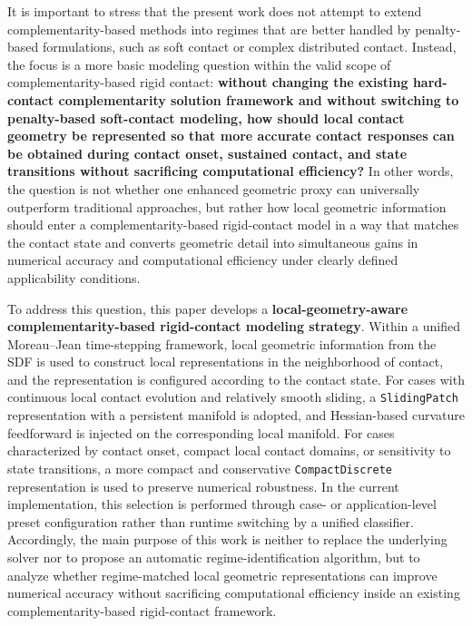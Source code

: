 It is important to stress that the present work does not attempt to extend complementarity-based methods into regimes that are better handled by penalty-based formulations, such as soft contact or complex distributed contact. Instead, the focus is a more basic modeling question within the valid scope of complementarity-based rigid contact: \textbf{without changing the existing hard-contact complementarity solution framework and without switching to penalty-based soft-contact modeling, how should local contact geometry be represented so that more accurate contact responses can be obtained during contact onset, sustained contact, and state transitions without sacrificing computational efficiency?} In other words, the question is not whether one enhanced geometric proxy can universally outperform traditional approaches, but rather how local geometric information should enter a complementarity-based rigid-contact model in a way that matches the contact state and converts geometric detail into simultaneous gains in numerical accuracy and computational efficiency under clearly defined applicability conditions.

To address this question, this paper develops a \textbf{local-geometry-aware complementarity-based rigid-contact modeling strategy}. Within a unified Moreau--Jean time-stepping framework, local geometric information from the SDF is used to construct local representations in the neighborhood of contact, and the representation is configured according to the contact state. For cases with continuous local contact evolution and relatively smooth sliding, a \texttt{SlidingPatch} representation with a persistent manifold is adopted, and Hessian-based curvature feedforward is injected on the corresponding local manifold. For cases characterized by contact onset, compact local contact domains, or sensitivity to state transitions, a more compact and conservative \texttt{CompactDiscrete} representation is used to preserve numerical robustness. In the current implementation, this selection is performed through case- or application-level preset configuration rather than runtime switching by a unified classifier. Accordingly, the main purpose of this work is neither to replace the underlying solver nor to propose an automatic regime-identification algorithm, but to analyze whether regime-matched local geometric representations can improve numerical accuracy without sacrificing computational efficiency inside an existing complementarity-based rigid-contact framework.

